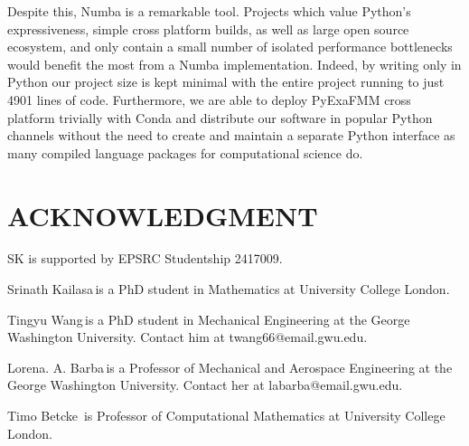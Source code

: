 \documentclass{IEEEcsmag}
\begin{document}
Despite this, Numba is a remarkable tool. Projects which value Python's expressiveness, simple cross platform builds, as well as large open source ecosystem, and only contain a small number of isolated performance bottlenecks would benefit the most from a Numba implementation. Indeed, by writing only in Python our project size is kept minimal with the entire project running to just 4901 lines of code. Furthermore, we are able to deploy PyExaFMM cross platform trivially with Conda and distribute our software in popular Python channels without the need to create and maintain a separate Python interface as many compiled language packages for computational science do. 

\section{ACKNOWLEDGMENT}

SK is supported by EPSRC Studentship 2417009.





\begin{IEEEbiography}{Srinath Kailasa}{\,}is a PhD student in Mathematics at University College London.
\end{IEEEbiography}

\begin{IEEEbiography}{Tingyu Wang}{\,}is a PhD student in Mechanical Engineering at the George Washington University. Contact him at twang66@email.gwu.edu.
\end{IEEEbiography}

\begin{IEEEbiography}{Lorena. A. Barba}{\,}is a Professor of Mechanical and Aerospace Engineering at the George Washington University.  Contact her at labarba@email.gwu.edu.
\end{IEEEbiography}

\begin{IEEEbiography}{Timo Betcke}{\,} is Professor of Computational Mathematics at University College London.
\end{IEEEbiography}
\end{document}
